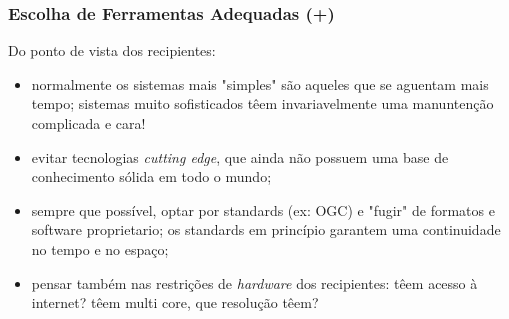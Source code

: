 \documentclass[hyperref={pdfpagelabels=true}]{beamer}
\begin{document}
\begin{frame}
\frametitle{Escolha de Ferramentas Adequadas (+)}
Do ponto de vista dos recipientes:%
    \begin{itemize}
      \item<2-> normalmente os sistemas mais "simples" s\~{a}o aqueles que se aguentam mais tempo; sistemas muito sofisticados t\^{e}em invariavelmente uma manunten\c{c}\~{a}o complicada e cara!%
      \item<3-> evitar tecnologias \textit{cutting edge}, que ainda n\~{a}o possuem uma base de conhecimento s\'{o}lida em todo o mundo; %
      \item<4-> sempre que poss\'{i}vel, optar por standards (ex: OGC) e "fugir" de formatos e software proprietario; os standards em princ\'{i}pio garantem uma continuidade no tempo e no espa\c{c}o;%
      \item<5-> pensar tamb\'{e}m nas restri\c{c}\~{o}es de \textit{hardware} dos recipientes: t\^{e}em acesso \`{a} internet?  t\^{e}em multi core, que resolu\c{c}\~{a}o t\^{e}em?%
      \end{itemize}
\end{frame}
\end{document}

